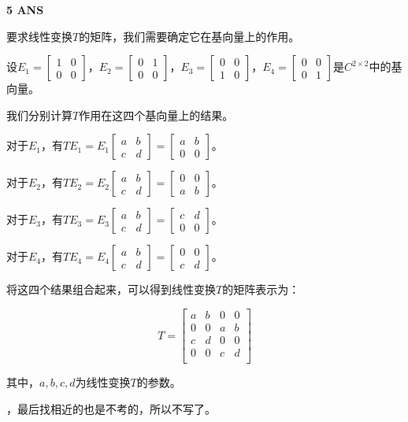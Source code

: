 \documentclass[11pt,letterpaper]{ctexart}
\begin{document}
\textbf{5 ANS}
\bigskip

要求线性变换$T$的矩阵，我们需要确定它在基向量上的作用。

设$E_1=\begin{bmatrix} 1 & 0 \\ 0 & 0 \end{bmatrix}$，$E_2=\begin{bmatrix} 0 & 1 \\ 0 & 0 \end{bmatrix}$，$E_3=\begin{bmatrix} 0 & 0 \\ 1 & 0 \end{bmatrix}$，$E_4=\begin{bmatrix} 0 & 0 \\ 0 & 1 \end{bmatrix}$是$C_{}^{2 \times 2}$中的基向量。

我们分别计算$T$作用在这四个基向量上的结果。

对于$E_1$，有$TE_1=E_1\begin{bmatrix} a & b \\ c & d \end{bmatrix}=\begin{bmatrix} a & b \\ 0 & 0 \end{bmatrix}$。

对于$E_2$，有$TE_2=E_2\begin{bmatrix} a & b \\ c & d \end{bmatrix}=\begin{bmatrix} 0 & 0 \\ a & b \end{bmatrix}$。

对于$E_3$，有$TE_3=E_3\begin{bmatrix} a & b \\ c & d \end{bmatrix}=\begin{bmatrix} c & d \\ 0 & 0 \end{bmatrix}$。

对于$E_4$，有$TE_4=E_4\begin{bmatrix} a & b \\ c & d \end{bmatrix}=\begin{bmatrix} 0 & 0 \\ c & d \end{bmatrix}$。

将这四个结果组合起来，可以得到线性变换$T$的矩阵表示为：

$$
T = \begin{bmatrix}
a & b & 0 & 0 \\
0 & 0 & a & b \\
c & d & 0 & 0 \\
0 & 0 & c & d \\
\end{bmatrix}
$$

其中，$a, b, c, d$为线性变换$T$的参数。

，最后找相近的也是不考的，所以不写了。
\end{document}
